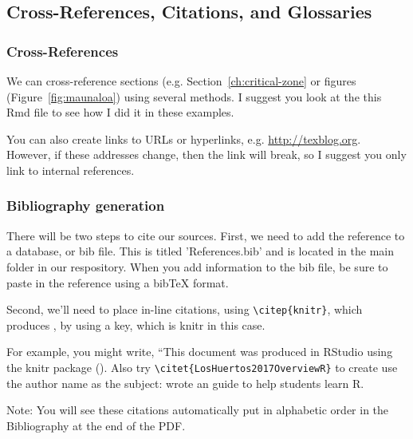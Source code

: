 \documentclass{book}\usepackage{knitr}
\begin{document}

\subsection{Cross-References, Citations, and Glossaries}

\subsubsection{Cross-References}

We can cross-reference sections (e.g. Section~\ref{ch:critical-zone}  or figures (Figure~\ref{fig:maunaloa}) using several methods. I suggest you look at the this Rmd file to see how I did it in these examples.

You can also create links to URLs or hyperlinks, e.g. \url{http://texblog.org}. However, if these addresses change, then the link will break, so I suggest you only link to internal references.

\subsubsection{Bibliography generation}

There will be two steps to cite our sources. First, we need to add the reference to a database, or bib file. This is titled 'References.bib' and is located in the main folder in our respository. When you add information to the bib file, be sure to paste in the reference using a bibTeX format. 

Second, we'll need to place in-line citations, using \verb"\citep{knitr}", which produces \citep{knitr}, by using a key, which is knitr in this case. 

For example, you might write, ``This document was produced in RStudio using the knitr package (\citep{knitr}). Also try \verb"\citet{LosHuertos2017OverviewR}" to create use the author name as the subject: \citet{LosHuertos2017OverviewR} wrote an guide to help students learn R. 

Note: You will see these citations automatically put in alphabetic order in the Bibliography at the end of the PDF. 
\end{document}
